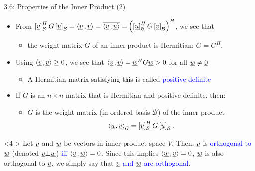 \documentclass[10pt,letterpaper,english]{beamer}
\begin{document}
\begin{frame}{3.6: Properties of the Inner Product (2)}

\begin{itemize}
\item<1-> From $\left[ \underline{v} \right]_{\mathcal{B}}^H G \left[ \underline{u} \right]_{\mathcal{B}} = {\left\langle  \underline{u}  \mskip2mu ,  \underline{v}  \right\rangle}
= \overline{ {\left\langle  \underline{v}  \mskip2mu ,  \underline{u}  \right\rangle} } = \left( \left[ \underline{u} \right]_{\mathcal{B}}^H G \left[ \underline{v} \right]_{\mathcal{B}} \right)^H$, we see that

\begin{itemize}
\item the weight matrix $G$ of an inner product is Hermitian: $G = G^H$.
\end{itemize}

\vspace{1mm}
\item<2-> Using ${\left\langle  \underline{v}  \mskip2mu ,  \underline{v}  \right\rangle} \geq 0$, we see that ${\left\langle  \underline{v}  \mskip2mu ,  \underline{v}  \right\rangle} = \underline{w}^H G \underline{w} > 0$ for all $\underline{w} \neq \underline{0}$

\begin{itemize}
\item A Hermitian matrix satisfying this is called  \textcolor{blue}{positive definite} 

\end{itemize}

\vspace{1mm}
\item<3-> If $G$ is an $n \times n$ matrix that is Hermitian and positive definite, then:
\begin{itemize}
\item $G$ is the weight matrix (in ordered basis $\mathcal{B}$) of the inner product
\begin{equation*}
{\left\langle  \underline{u}  \mskip2mu ,  \underline{v}  \right\rangle}_G
= \left[ \underline{v} \right]_{\mathcal{B}}^H G \left[ \underline{u} \right]_{\mathcal{B}}.
\end{equation*}
\end{itemize}

\end{itemize}

\begin{definition}[Orthogonal]<4->
Let $\underline{v}$ and $\underline{w}$ be vectors in inner-product space $V$.
Then, $\underline{v}$ is \textcolor{blue}{orthogonal to $\underline{w}$} (denoted $\underline{v} \bot \underline{w}$) \textcolor{blue}{iff ${\left\langle  \underline{v}  \mskip2mu ,  \underline{w}  \right\rangle} = 0$}.
Since this implies ${\left\langle  \underline{w}  \mskip2mu ,  \underline{v}  \right\rangle} = 0$, $\underline{w}$ is also orthogonal to $\underline{v}$, we simply say that \textcolor{blue}{$\underline{v}$ and $\underline{w}$ are orthogonal}.
\end{definition}

\end{frame}
\end{document}
